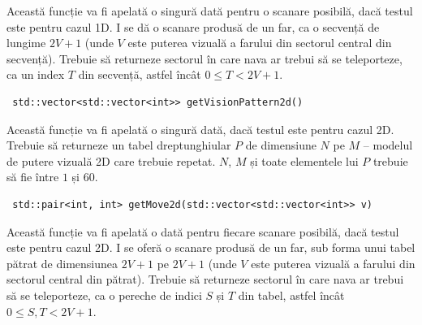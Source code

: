 \documentclass[12pt]{article}
\begin{document}
Această funcție va fi apelată o singură dată pentru o scanare posibilă, dacă testul este pentru cazul 1D. I se dă o scanare produsă de un far, ca o secvență de lungime $2V + 1$ (unde $V$ este puterea vizuală a farului din sectorul central din secvență). Trebuie să returneze sectorul în care nava ar trebui să se teleporteze, ca un index $T$ din secvență, astfel încât $0 \leq T < 2V + 1$.

\begin{lstlisting}
 std::vector<std::vector<int>> getVisionPattern2d()
\end{lstlisting}


Această funcție va fi apelată o singură dată, dacă testul este pentru cazul 2D. Trebuie să returneze un tabel dreptunghiular $P$ de dimensiune $N$ pe $M$ -- modelul de putere vizuală 2D care trebuie repetat. $N$, $M$ și toate elementele lui $P$ trebuie să fie între $1$ și $60$.

\begin{lstlisting}
 std::pair<int, int> getMove2d(std::vector<std::vector<int>> v)
\end{lstlisting}


Această funcție va fi apelată o dată pentru fiecare scanare posibilă, dacă testul este pentru cazul 2D. I se oferă o scanare produsă de un far, sub forma unui tabel pătrat de dimensiunea $2V + 1$ pe $2V + 1$ (unde $V$ este puterea vizuală a farului din sectorul central din pătrat). Trebuie să returneze sectorul în care nava ar trebui să se teleporteze, ca o pereche de indici $S$ și $T$ din tabel, astfel încât $0 \leq S, T < 2V + 1$.

\end{document}
